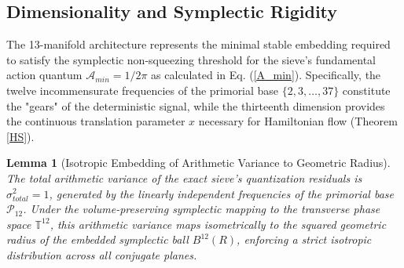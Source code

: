 \documentclass[sn-mathphys-num, pdflatex, referee]{sn-jnl}
\newtheorem{lemma}{Lemma}
\begin{document}
\subsection{Dimensionality and Symplectic Rigidity}
The 13-manifold architecture represents the minimal stable embedding required to satisfy the symplectic non-squeezing threshold for the sieve's fundamental action quantum $\mathcal{A}_{min} = 1/2\pi$ as calculated in Eq. (\ref{A_min}). Specifically, the twelve incommensurate frequencies of the primorial base $\{2, 3, \dots, 37\}$ constitute the "gears" of the deterministic signal, while the thirteenth dimension provides the continuous translation parameter $x$ necessary for Hamiltonian flow (Theorem \ref{HS}). 

\begin{lemma}[Isotropic Embedding of Arithmetic Variance to Geometric Radius]
\label{lemma:variance_radius_isomorphism}
The total arithmetic variance of the exact sieve's quantization residuals is $\sigma_{total}^2 = 1$, generated by the linearly independent frequencies of the primorial base $\mathcal{P}_{12}$. Under the volume-preserving symplectic mapping to the transverse phase space $\mathbb{T}^{12}$, this arithmetic variance maps isometrically to the squared geometric radius of the embedded symplectic ball $B^{12}(R)$, enforcing a strict isotropic distribution across all conjugate planes.
\end{lemma}
\end{document}
